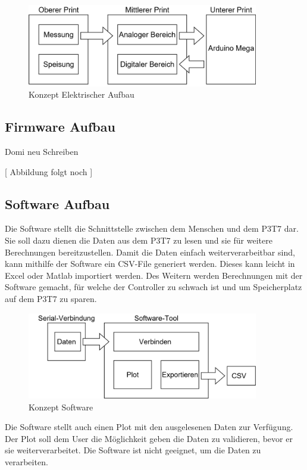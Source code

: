\begin{figure}[H]
\begin{center}
\includegraphics[width=0.9\textwidth]{images/Konzept_Elektrischer_Aufbau.png}
\caption{Konzept Elektrischer Aufbau}
\end{center}
\end{figure}


\subsection{Firmware Aufbau}
Domi neu Schreiben

[ Abbildung folgt noch ]  

\subsection{Software Aufbau}
Die Software stellt die Schnittstelle zwischen dem Menschen und dem P3T7 dar. Sie soll dazu dienen die Daten aus dem P3T7 zu lesen und sie für weitere Berechnungen bereitzustellen. Damit die Daten einfach weiterverarbeitbar sind, kann mithilfe der Software ein CSV-File generiert werden. Dieses kann leicht in Excel oder Matlab importiert werden. Des Weitern werden Berechnungen mit der Software gemacht, für welche der Controller zu schwach ist und um Speicherplatz auf dem P3T7 zu sparen.

\begin{figure}[H]
\begin{center}
\includegraphics[width=0.9\textwidth]{images/Konzept_Software.png}
\caption{Konzept Software}
\end{center}
\end{figure}

Die Software stellt auch einen Plot mit den ausgelesenen Daten zur Verfügung. Der Plot soll dem User die Möglichkeit geben die Daten zu validieren, bevor er sie weiterverarbeitet. Die Software ist nicht geeignet, um die Daten zu verarbeiten.